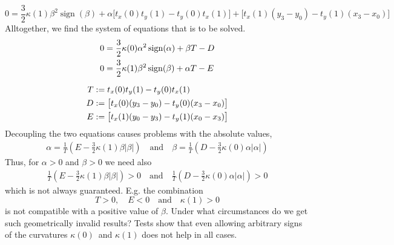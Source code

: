 \documentclass{article}
\newcommand{\sign}{\operatorname{sign}}
\begin{document}
\begin{equation}
  0 = \frac{3}{2}\kappa(1) \beta^2 \sign(\beta)
    + \alpha \bigl[t_x(0)t_y(1) - t_y(0)t_x(1)\bigr]
    + \bigl[t_x(1) (y_3-y_0) - t_y(1) (x_3-x_0)\bigr]
\end{equation}
%
Alltogether, we find the system of equations that is to be solved.
%
\begin{gather}
  \begin{aligned}
    0 &= \frac{3}{2} \kappa(0) \alpha^2 \sign(\alpha) + \beta T - D \\
    0 &= \frac{3}{2} \kappa(1) \beta^2 \sign(\beta) + \alpha T - E
  \end{aligned}\\[\medskipamount]
  \begin{aligned}
    T &:= t_x(0)t_y(1) - t_y(0)t_x(1) \\
    D &:= \bigl[t_x(0) (y_3-y_0) - t_y(0) (x_3-x_0)\bigr]\\
    E &:= \bigl[t_x(1) (y_0-y_3) - t_y(1) (x_0-x_3)\bigr]
  \end{aligned}
\end{gather}
%
Decoupling the two equations causes problems with the absolute values,
%
\begin{align}
  \alpha = \frac{1}{T}\left(E - \frac{3}{2}\kappa(1)\beta |\beta |\right)\quad\text{and}\quad
  \beta  = \frac{1}{T}\left(D - \frac{3}{2}\kappa(0)\alpha|\alpha|\right)
\end{align}
%
Thus, for $\alpha>0$ and $\beta>0$ we need also
%
\begin{align}
  \frac{1}{T}\left(E - \frac{3}{2}\kappa(1)\beta |\beta |\right) > 0\quad\text{and}\quad
  \frac{1}{T}\left(D - \frac{3}{2}\kappa(0)\alpha|\alpha|\right) > 0
\end{align}
%
which is not always guaranteed. E.g. the combination
%
\begin{equation}
  T>0,\quad E<0\quad\text{and}\quad \kappa(1)>0
\end{equation}
%
is not compatible with a positive value of $\beta$. Under what circumstances do
we get such geometrically invalid results? Tests show that even allowing
arbitrary signs of the curvatures $\kappa(0)$~and $\kappa(1)$ does not help in
all cases.
\end{document}
